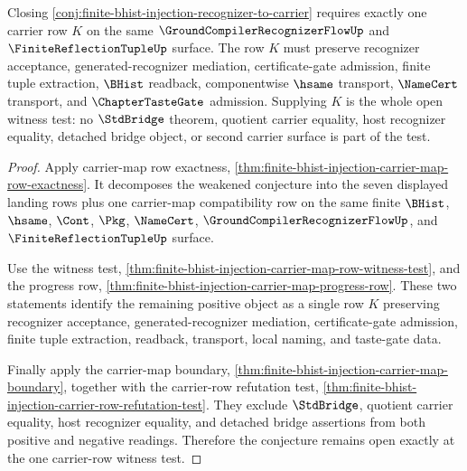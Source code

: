 \begin{theorem}
\label{thm:finite-bhist-injection-carrier-row-open-test}
Closing \autoref{conj:finite-bhist-injection-recognizer-to-carrier} requires exactly one carrier row $K$ on the same $\GroundCompilerRecognizerFlowUp$ and $\FiniteReflectionTupleUp$ surface. The row $K$ must preserve recognizer acceptance, generated-recognizer mediation, certificate-gate admission, finite tuple extraction, $\BHist$ readback, componentwise $\hsame$ transport, $\NameCert$ transport, and $\ChapterTasteGate$ admission. Supplying $K$ is the whole open witness test: no $\StdBridge$ theorem, quotient carrier equality, host recognizer equality, detached bridge object, or second carrier surface is part of the test.
\end{theorem}
\begin{proof}
Apply carrier-map row exactness, \autoref{thm:finite-bhist-injection-carrier-map-row-exactness}. It decomposes the weakened conjecture into the seven displayed landing rows plus one carrier-map compatibility row on the same finite $\BHist$, $\hsame$, $\Cont$, $\Pkg$, $\NameCert$, $\GroundCompilerRecognizerFlowUp$, and $\FiniteReflectionTupleUp$ surface.

Use the witness test, \autoref{thm:finite-bhist-injection-carrier-map-row-witness-test}, and the progress row, \autoref{thm:finite-bhist-injection-carrier-map-progress-row}. These two statements identify the remaining positive object as a single row $K$ preserving recognizer acceptance, generated-recognizer mediation, certificate-gate admission, finite tuple extraction, readback, transport, local naming, and taste-gate data.

Finally apply the carrier-map boundary, \autoref{thm:finite-bhist-injection-carrier-map-boundary}, together with the carrier-row refutation test, \autoref{thm:finite-bhist-injection-carrier-row-refutation-test}. They exclude $\StdBridge$, quotient carrier equality, host recognizer equality, and detached bridge assertions from both positive and negative readings. Therefore the conjecture remains open exactly at the one carrier-row witness test.
\end{proof}

